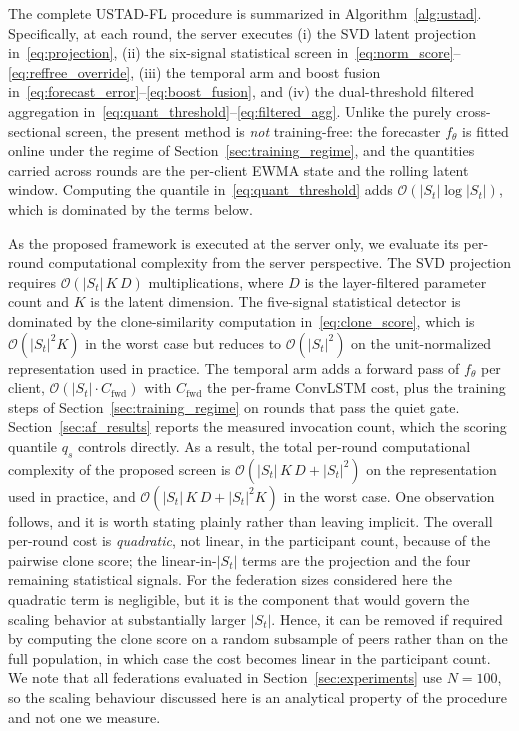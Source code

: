 \documentclass[journal]{IEEEtran}
\begin{document}
The complete USTAD-FL procedure is summarized in Algorithm~\ref{alg:ustad}. Specifically, at each round, the server executes (i) the SVD latent projection in~\eqref{eq:projection}, (ii) the six-signal statistical screen in~\eqref{eq:norm_score}--\eqref{eq:reffree_override}, (iii) the temporal arm and boost fusion in~\eqref{eq:forecast_error}--\eqref{eq:boost_fusion}, and (iv) the dual-threshold filtered aggregation in~\eqref{eq:quant_threshold}--\eqref{eq:filtered_agg}. Unlike the purely cross-sectional screen, the present method is \emph{not} training-free: the forecaster $f_\theta$ is fitted online under the regime of Section~\ref{sec:training_regime}, and the quantities carried across rounds are the per-client EWMA state and the rolling latent window. Computing the quantile in~\eqref{eq:quant_threshold} adds $\mathcal{O}(|S_t|\log|S_t|)$, which is dominated by the terms below.

As the proposed framework is executed at the server only, we evaluate its per-round computational complexity from the server perspective. The SVD projection requires $\mathcal{O}(|S_t|\,K\,D)$ multiplications, where $D$ is the layer-filtered parameter count and $K$ is the latent dimension. The five-signal statistical detector is dominated by the clone-similarity computation in~\eqref{eq:clone_score}, which is $\mathcal{O}(|S_t|^2 K)$ in the worst case but reduces to $\mathcal{O}(|S_t|^2)$ on the unit-normalized representation used in practice. The temporal arm adds a forward pass of $f_\theta$ per client, $\mathcal{O}(|S_t| \cdot C_{\mathrm{fwd}})$ with $C_{\mathrm{fwd}}$ the per-frame ConvLSTM cost, plus the training steps of Section~\ref{sec:training_regime} on rounds that pass the quiet gate. Section~\ref{sec:af_results} reports the measured invocation count, which the scoring quantile $q_s$ controls directly. As a result, the total per-round computational complexity of the proposed screen is
$\mathcal{O}(|S_t|\,K\,D + |S_t|^2)$ on the representation used in practice, and
$\mathcal{O}(|S_t|\,K\,D + |S_t|^2 K)$ in the worst case. One observation follows, and it is
worth stating plainly rather than leaving implicit. The overall per-round cost is
\emph{quadratic}, not linear, in the participant count, because of the pairwise clone score;
the linear-in-$|S_t|$ terms are the projection and the four remaining statistical signals. For
the federation sizes considered here the quadratic term is negligible, but it is the component
that would govern the scaling behavior at substantially larger $|S_t|$. Hence, it can be
removed if required by computing the clone score on a random subsample of peers rather than on
the full population, in which case the cost becomes linear in the participant count. We note
that all federations evaluated in Section~\ref{sec:experiments} use $N = 100$, so the scaling
behaviour discussed here is an analytical property of the procedure and not one we measure.
\end{document}
